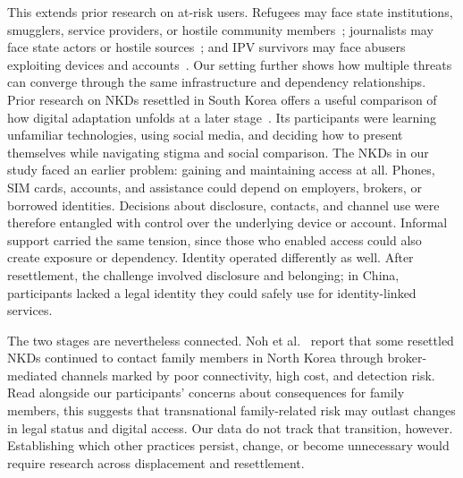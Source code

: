 \documentclass[conference,compsoc]{IEEEtran}
\begin{document}
This extends prior research on at-risk users. Refugees may face state institutions, smugglers, service providers, or hostile community members~\cite{simko2018computer,tran2024security}; journalists may face state actors or hostile sources~\cite{mcgregor2017weakest}; and IPV survivors may face abusers exploiting devices and accounts~\cite{freed2017digital,matthews2017stories}. Our setting further shows how multiple threats can converge through the same infrastructure and dependency relationships. Prior research on NKDs resettled in South Korea offers a useful comparison of how digital adaptation unfolds at a later stage~\cite{noh2024starting,noh2025bridging}. Its participants were learning unfamiliar technologies, using social media, and deciding how to present themselves while navigating stigma and social comparison. The NKDs in our study faced an earlier problem: gaining and maintaining access at all. Phones, SIM cards, accounts, and assistance could depend on employers, brokers, or borrowed identities. Decisions about disclosure, contacts, and channel use were therefore entangled with control over the underlying device or account. Informal support carried the same tension, since those who enabled access could also create exposure or dependency. Identity operated differently as well. After resettlement, the challenge involved disclosure and belonging; in China, participants lacked a legal identity they could safely use for identity-linked services.

The two stages are nevertheless connected. Noh et al.~\cite{noh2024starting} report that some resettled NKDs continued to contact family members in North Korea through broker-mediated channels marked by poor connectivity, high cost, and detection risk. Read alongside our participants' concerns about consequences for family members, this suggests that transnational family-related risk may outlast changes in legal status and digital access. Our data do not track that transition, however. Establishing which other practices persist, change, or become unnecessary would require research across displacement and resettlement.
\end{document}
